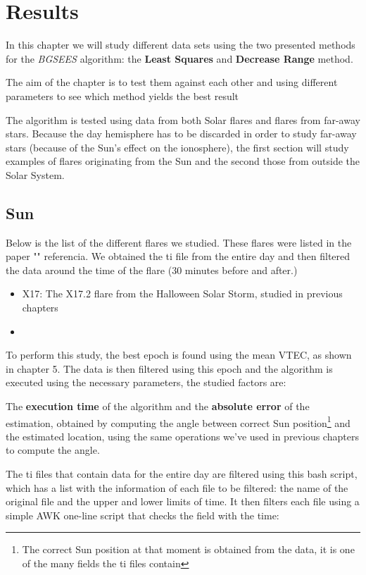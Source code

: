 \chapter{Results}

In this chapter we will study different data sets using the two presented methods for the \textit{BGSEES} algorithm: the \textbf{Least Squares} and \textbf{Decrease Range} method. 

The aim of the chapter is to test them against each other and using different parameters to see which method yields the best result

The algorithm is tested using data from both Solar flares and flares from far-away stars. Because the day hemisphere has to be discarded in order to study far-away stars (because of the Sun's effect on the ionosphere), the first section will study examples of flares originating from the Sun and the second those from outside the Solar System.

\section{Sun}

Below is the list of the different flares we studied. These flares were listed in the paper "" referencia. We obtained the ti file from the entire day and then filtered the data around the time of the flare (30 minutes before and after.)

\begin{itemize}
	\item X17: The X17.2 flare from the Halloween Solar Storm, studied in previous chapters
	\item 
\end{itemize}

To perform this study, the best epoch is found using the mean VTEC, as shown in chapter 5. The data is then filtered using this epoch and the algorithm is executed using the necessary parameters, the studied factors are:

The \textbf{execution time} of the algorithm and the \textbf{absolute error} of the estimation, obtained by computing the angle between correct Sun position\footnote{The correct Sun position at that moment is obtained from the data, it is one of the many fields the ti files contain} and the estimated location, using the same operations we've used in previous chapters to compute the angle. 

The ti files that contain data for the entire day are filtered using this bash script, which has a list with the information of each file to be filtered: the name of the original file and the upper and lower limits of time. It then filters each file using a simple AWK one-line script that checks the field with the time:

